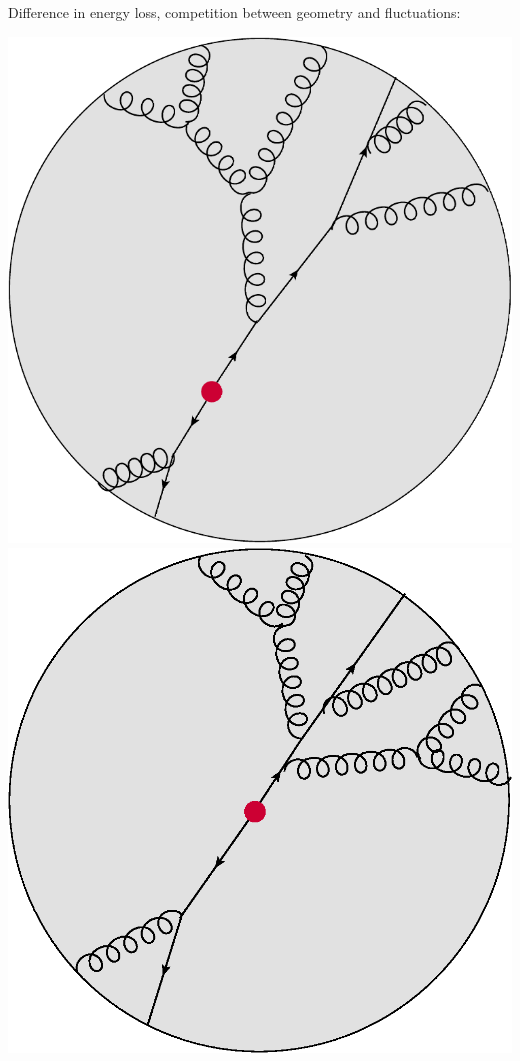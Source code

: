 \documentclass[pstricks,mathserif]{beamer}
\begin{document}
\begin{frame}


Difference in energy loss, competition between geometry and fluctuations:

\vspace*{0.5cm}

	\centering
	\includegraphics[width=0.7\linewidth, angle=180,origin=c]{Dijet_flucts1.pdf}
\endminipage\hfill
{}
	\centering
  	\includegraphics[width=0.7\linewidth, angle=180,origin=c]{Dijet_flucts2.eps}
\endminipage\hfill
\vspace*{1cm}


\end{frame}
\end{document}
